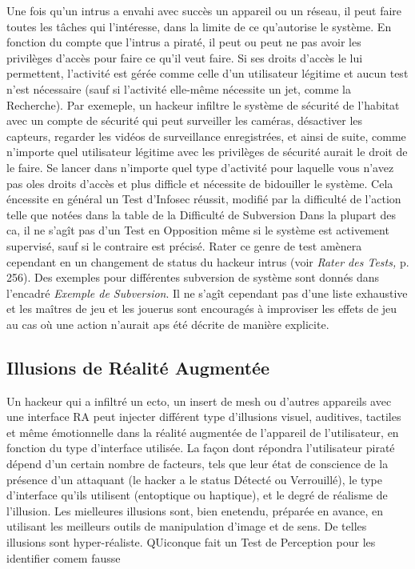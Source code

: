 Une fois qu'un intrus a envahi avec succès un appareil ou un réseau, il peut faire toutes les tâches qui l'intéresse, dans la limite de ce qu'autorise le système. En fonction du compte que l'intrus a piraté, il peut ou peut ne pas avoir les privilèges d'accès pour faire ce qu'il veut faire. Si ses droits d'accès le lui permettent, l'activité est gérée comme celle d'un utilisateur légitime et aucun test n'est nécessaire (sauf si l'activité elle-même nécessite un jet, comme la Recherche). Par exemeple, un hackeur infiltre le système de sécurité de l'habitat avec un compte de sécurité qui peut surveiller les caméras, désactiver les capteurs, regarder les vidéos de surveillance enregistrées, et ainsi de suite, comme n'importe quel utilisateur légitime avec les privilèges de sécurité aurait le droit de le faire. Se lancer dans n'importe quel type d'activité pour laquelle vous n'avez pas oles droits d'accès et plus difficle et nécessite de bidouiller le système. Cela éncessite en général un Test d'Infosec réussit, modifié par la difficulté de l'action telle que notées dans la table de la Difficulté de Subversion Dans la plupart des ca, il ne s'agît pas d'un Test en Opposition même si le système est activement supervisé, sauf si le contraire est précisé. Rater ce genre de test amènera cependant en un changement de status du hackeur intrus (voir \textit{Rater des Tests,} p. 256). Des exemples pour différentes subversion de système sont donnés dans l'encadré \textit{Exemple de Subversion}. Il ne s'agît cependant pas d'une liste exhaustive et les maîtres de jeu et les jouerus sont encouragés à improviser les effets de jeu au cas où une action n'aurait aps été décrite de manière explicite. 

\subsection{Illusions de Réalité Augmentée} 

Un hackeur qui a infiltré un ecto, un insert de mesh ou d'autres appareils avec une interface RA peut injecter différent type d'illusions visuel, auditives, tactiles et même émotionnelle dans la réalité augmentée de l'appareil de l'utilisateur, en fonction du type d'interface utilisée. La façon dont répondra l'utilisateur piraté dépend d'un certain nombre de facteurs, tels que leur état de conscience de la présence d'un attaquant (le hacker a le status Détecté ou Verrouillé), le type d'interface qu'ils utilisent (entoptique ou haptique), et le degré de réalisme de l'illusion. Les mielleures illusions sont, bien enetendu, préparée en avance, en utilisant les meilleurs outils de manipulation d'image et de sens. De telles illusions sont hyper-réaliste. QUiconque fait un Test de Perception pour les identifier comem fausse 

